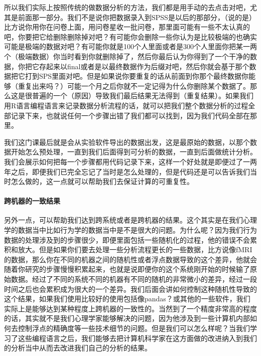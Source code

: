 \documentclass[
  oneside]{book}
\begin{document}
所以我们实际上按照传统的做数据分析的方法，我们都是用手动的去点击对吧，尤其是前面那一部分。我们不是说你把数据录入到SPSS是以后的那部分，（说的是）比方说你用你在问卷上面，用问卷星收一批问卷，那里面可能有一些不太认真的吧，你要把它给删除删除掉对吧？有可能你会删除一些你认为是比较极端的也确实可能是极端的数据对吧？有可能你就是100个人里面或者是300个人里面你把某一两个（极端数据）你当时看到你就删除掉了，然后你最后认为你得到了一个干净的数据，你把它存起来以final或者是以最终数据作为后缀对吧，然后你就会基于那个数据把它打到SPS里面对吧。但是如果说你要重复的话从前面到你那个最终数据你能够（重复出来吗？）可能一个月之后你就不一定记得为什么你删除某个数据了。那么这是很普遍的一个（原因）导致我们最后结果无法得到（重复结果）。如果我们用R语言编程语言来记录数据分析流程的话，就可以把我们整个数据分析的过程全部记录下来，也就说任何一个步骤出错了我们都可以找到，因为我们代码全部在那里。

我们这门课最后就是会从实验软件导出的数据出发，这是最原始的数据，以那个数据开始怎么预处理，一直到我们后面得到可分析的数据，一直到后面做统计分析。我们会展示如何把每一个步骤都用代码记录下来，这样一个好处就是即便过了一两年之后，即便我们已完全忘记了当时是怎么处理的，但是代码还是可以告诉我们当时怎么做的，这一点就可以帮助我们去保证计算的可重复性。

\hypertarget{ux8de8ux673aux5668ux7684ux4e00ux81f4ux7ed3ux679c}{%
\paragraph{\texorpdfstring{\textbf{跨机器的一致结果}}{跨机器的一致结果}}\label{ux8de8ux673aux5668ux7684ux4e00ux81f4ux7ed3ux679c}}

另外一点，可以帮助我们达到跨系统或者是跨机器的结果。这个其实是在我们心理学的数据当中比如行为学的数据当中是不是很大的问题。为什么呢？因为我们行为数据的处理涉及到的步骤很少，即便里面包括一些随机化的过程，他的错误不会累积和放大。但是如果你们要去处理一些分析流程更长的一些数据，比方说像fMRI的数据，那么你在不同的机器之间的随机性或者浮点数据导致的这个差异，他就会随着你研究的步骤慢慢积累起来，也就是说即便你的这个系统刚开始的时候输了原始数据。经过了不同的系统不同的机器有不同的随机的非常微小的差异，经过一段时间之后也会累积成为很大的一个差异。我们后面会讲如何控制这种随机性导致的这个结果，如果我们使用比较好的使用包括像pandas？或其他的一些软件，我们实际上是能够达到某种程度上跨机器的一致性的。当然到了一个精度非常高的程度的话，其实就不是我们心理学家能够解决的问题，因为他涉及到一些计算机内部如何去控制浮点的精确度等一些技术细节的问题。但是我们可以怎么样呢？当我们学习了这些编程语言之后，我们能够去把计算机科学家在这方面做的改进纳入到我们的分析当中从而去改进我们自己的分析的结果。
\end{document}
